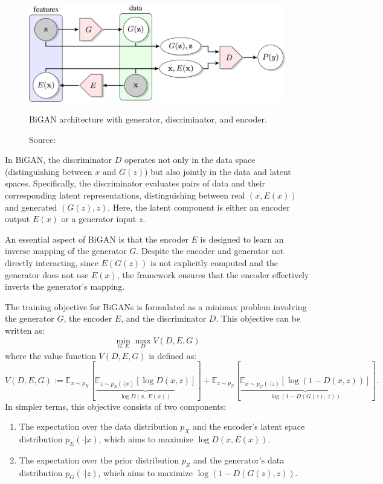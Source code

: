 \begin{figure}[h]
    \centering
    \includegraphics[width=\textwidth]{figures/ch3/6.bigan.png}
    \caption{BiGAN architecture with generator, discriminator, and encoder.}
    \vspace{-10px}
    \caption*{\scriptsize{Source: \cite{donahue2017}}}
    \label{fig:bigan}
\end{figure}

In BiGAN, the discriminator \( D \) operates not only in the data space
(distinguishing between \( x \) and \( G(z) \)) but also jointly in the
data and latent spaces. Specifically, the discriminator evaluates pairs
of data and their corresponding latent representations, distinguishing
between real \( (x, E(x)) \) and generated \( (G(z), z) \).
Here, the latent component is either an encoder output \( E(x) \) 
or a generator input \( z \).

An essential aspect of BiGAN is that the encoder \( E \) is designed
to learn an inverse mapping of the generator \( G \).
Despite the encoder and generator not directly interacting, since
\( E(G(z)) \) is not explicitly computed and the generator does not use
\( E(x) \), the framework ensures that the encoder effectively inverts
the generator's mapping.

The training objective for BiGANs is formulated as a minimax problem involving the generator \( G \), the encoder \( E \), and the discriminator \( D \). This objective can be written as:
\[
\min_{G, E} \max_{D} V(D, E, G)
\]
where the value function \( V(D, E, G) \) is defined as:
\begin{equation}
V(D, E, G) := \mathbb{E}_{x \sim p_X} [ \underset{\log D(x,\, E(x)) }{\underbrace{\mathbb{E}_{z \sim p_E(\cdot | x)} \left[ \log D(x, z) \right]}}  ] +
\mathbb{E}_{z \sim p_Z} [ \underset{\log(1 - D(G(z),\, z))}{\underbrace{\mathbb{E}_{x \sim p_G(\cdot | z)} \left[ \log(1 - D(x, z)) \right]}} ].
\end{equation}
In simpler terms, this objective consists of two components:
\begin{enumerate}
    \item The expectation over the data distribution \( p_X \)
    and the encoder's latent space distribution \( p_E(\cdot | x) \),
    which aims to maximize \( \log D(x, E(x)) \).
    \item The expectation over the prior distribution \( p_Z \)
    and the generator's data distribution \( p_G(\cdot | z) \),
    which aims to maximize \( \log(1 - D(G(z), z)) \).
\end{enumerate}

